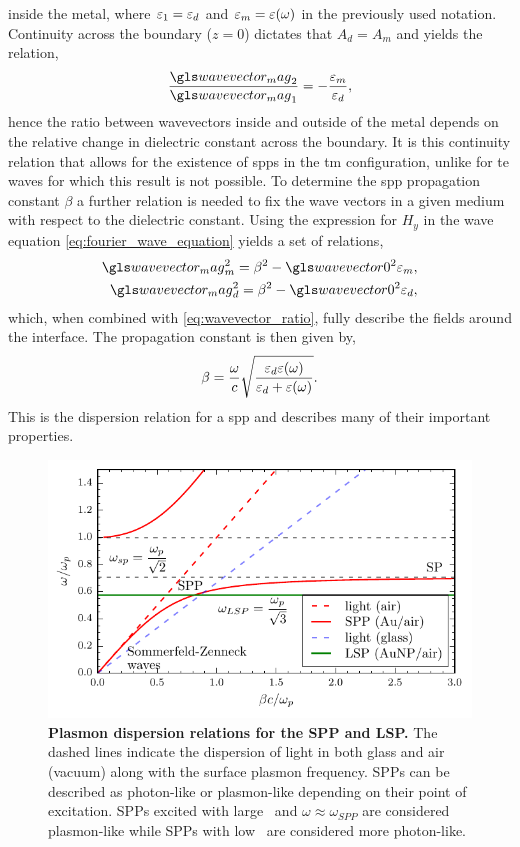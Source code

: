 \documentclass{article}
\begin{document}
inside the metal, where $\varepsilon_1=\varepsilon_d$ and $\varepsilon_m=\varepsilon(\omega)$ in the previously used notation. Continuity across the boundary ($z=0$) dictates that $A_d=A_m$ and yields the relation,
\begin{equation}
	\frac{\wvm_2}{\wvm_1} = -\frac{\epsmet}{\epsdi},
	\label{eq:wavevector_ratio}
\end{equation}
hence the ratio between wavevectors inside and outside of the metal depends on the relative change in dielectric constant across the boundary. It is this continuity relation that allows for the existence of \glspl{spp} in the \gls{tm} configuration, unlike for \gls{te} waves for which this result is not possible. To determine the \gls{spp} propagation constant $\beta$ a further relation is needed to fix the wave vectors in a given medium with respect to the dielectric constant. Using the expression for $H_y$ in the wave equation \eqref{eq:fourier_wave_equation} yields a set of relations,
\begin{subequations}
\begin{align}
	\wvm_m^2 = \beta^2 - \wvz^2\epsmet,\\
	\wvm_d^2 = \beta^2 - \wvz^2\epsdi,
\end{align}
\end{subequations}
which, when combined with \eqref{eq:wavevector_ratio}, fully describe the fields around the interface. The propagation constant is then given by,
\begin{equation}
	\beta = \frac{\omega}{c}\sqrt{\frac{\varepsilon_d\varepsilon(\omega)}{\varepsilon_d + \varepsilon(\omega)}}.
	\label{eq:spp_dispersion}
\end{equation}
This is the dispersion relation for a \gls{spp} and describes many of their important properties.

\begin{figure}[bt]
\centering
\includegraphics{figures/spp_dispersion}
\caption[Plasmon dispersion relations for the SPP and LSP]{\textbf{Plasmon dispersion relations for the SPP and LSP.} The dashed lines indicate the dispersion of light in both glass and air (vacuum) along with the surface plasmon frequency. SPPs can be described as photon-like or plasmon-like depending on their point of excitation. SPPs excited with large \wvm\ and $\omega\approx\omega_{SPP}$ are considered plasmon-like while SPPs with low \wvm\ are considered more photon-like.}
\label{fig:spp_dispersion}
\end{figure}
\end{document}
